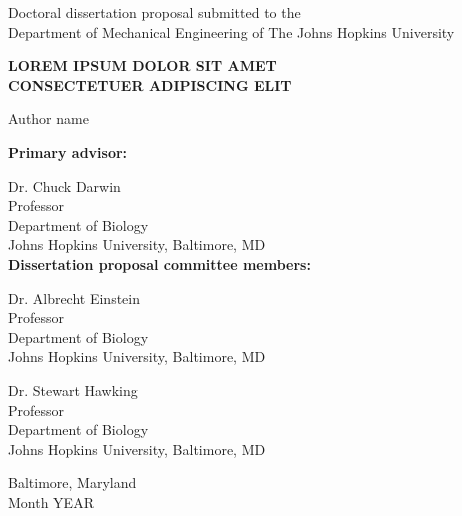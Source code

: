 \documentclass[12pt]{article}
\numberwithin{equation}{section}
\begin{document}

\vspace*{0.025in}
\thispagestyle{empty}

\begin{center}
    Doctoral dissertation proposal submitted to the \\
    Department of Mechanical Engineering of The Johns Hopkins University \\
    
    \vspace{0.65in}

    \MakeUppercase{\textbf{LOREM IPSUM DOLOR SIT AMET\\CONSECTETUER ADIPISCING ELIT}}       %
    
    \vspace{0.25in}
    
    Author name   %
\end{center}


\vspace{0.75in}
\begin{singlespace}

    \textbf{Primary advisor:}
    
    Dr. Chuck Darwin \\
    Professor \\
    Department of Biology \\
    Johns Hopkins University, Baltimore, MD \\

    \textbf{Dissertation proposal committee members:} 
    
    Dr. Albrecht Einstein \\
    Professor\\
    Department of Biology \\
    Johns Hopkins University, Baltimore, MD
    
    Dr. Stewart Hawking \\
    Professor\\
    Department of Biology \\
    Johns Hopkins University, Baltimore, MD 
    
\end{singlespace}

\vspace{0.75in}
\begin{center}
    Baltimore, Maryland \\  %
    Month YEAR              %
\end{center}
\end{document}
